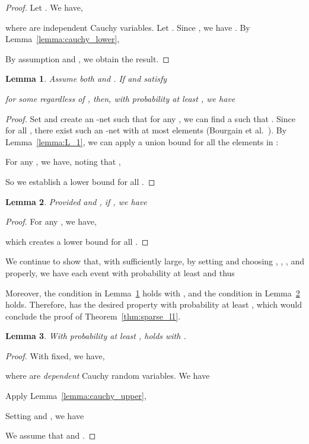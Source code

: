 \documentclass[11pt]{article}
\newtheorem{lemma}{Lemma}
\begin{document}
\begin{proof}
  Let . We have,
  
  where  are independent Cauchy variables.
  Let .
  Since , we have .
  By Lemma~\ref{lemma:cauchy_lower},
  
  By assumption  and , we obtain the result.
\end{proof}

\begin{lemma}
  \label{lemma:L_all}
  Assume both  and .
  If  and  satisfy
  
  for some  regardless of , then, with probability at
  least , we have
  
\end{lemma}
\begin{proof}
  Set  and create an -net
   such that for any , we can find a
   such that .
  Since  for all , there exist such an -net
  with at most  elements (Bourgain et al.~\cite{BLM89}).
  By Lemma~\ref{lemma:L_1}, we can apply a union bound for all the elements in
  :
  
  For any , we have, noting that ,
  
  So we establish a lower bound for all .
\end{proof}

\begin{lemma}
  \label{lemma:lower_H}
  Provided  and , if , we have
  
\end{lemma}
\begin{proof}
  For any , we have,
  
  which creates a lower bound for all .
\end{proof}

We continue to show that, with  sufficiently large, by setting  and choosing , , ,
and  properly, we have each event with probability at least  and thus

Moreover, the condition in Lemma~\ref{lemma:L_all} holds with ,
and the condition in Lemma~\ref{lemma:lower_H} holds.
Therefore,  has the desired property with probability at least ,
which would conclude the proof of Theorem~\ref{thm:sparse_l1}.

\begin{lemma}
  \label{lemma:E_U}
  With probability at least ,  holds with .
\end{lemma}
\begin{proof}
  With  fixed, we have,
  
  where  are \emph{dependent} Cauchy random variables. We have
  
  Apply Lemma~\ref{lemma:cauchy_upper},
  
  Setting  and , we have
  
  We assume that  and .
\end{proof}
\end{document}

